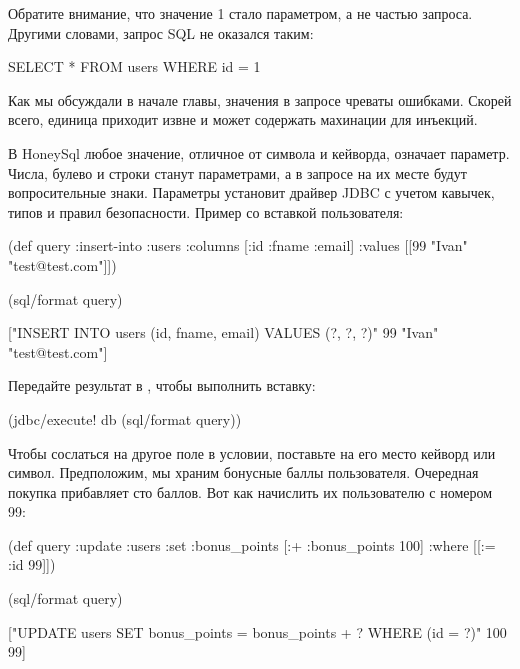Обратите внимание, что значение 1 стало параметром, а не частью запроса. Другими словами, запрос SQL не оказался таким:

\begin{english}
  \begin{sql}
SELECT * FROM users WHERE id = 1
  \end{sql}
\end{english}

Как мы обсуждали в начале главы, значения в запросе чреваты ошибками. Скорей всего, единица приходит извне и может содержать махинации для инъекций.

В HoneySql любое значение, отличное от символа и кейворда, означает параметр. Числа, булево и строки станут параметрами, а в запросе на их месте будут вопросительные знаки. Параметры установит драйвер JDBC с учетом кавычек, типов и правил безопасности. Пример со вставкой пользователя:

\begin{english}
  \begin{clojure}
(def query
  {:insert-into :users
   :columns [:id :fname :email]
   :values [[99 "Ivan" "test@test.com"]]})

(sql/format query)

["INSERT INTO users (id, fname, email) VALUES (?, ?, ?)"
 99
 "Ivan"
 "test@test.com"]
  \end{clojure}
\end{english}

Передайте результат в , чтобы выполнить вставку:

\begin{english}
  \begin{clojure}
(jdbc/execute! db (sql/format query))
  \end{clojure}
\end{english}

Чтобы сослаться на другое поле в условии, поставьте на его место кейворд или символ. Предположим, мы храним бонусные баллы пользователя. Очередная покупка прибавляет сто баллов. Вот как начислить их пользователю с номером 99:

\begin{english}
  \begin{clojure}
(def query
  {:update :users
   :set {:bonus_points [:+ :bonus_points 100]}
   :where [[:= :id 99]]})

(sql/format query)

["UPDATE users SET bonus_points = bonus_points + ? WHERE (id = ?)" 100 99]
  \end{clojure}
\end{english}

